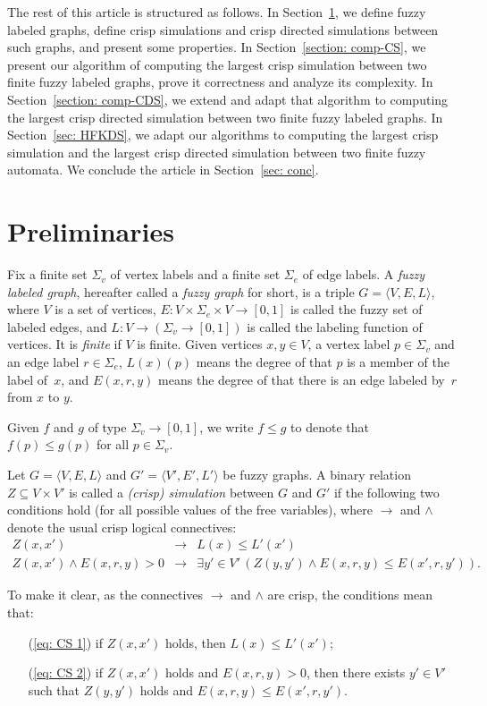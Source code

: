 \documentclass[11pt]{article}
\newcommand{\red}[1]{{#1}\xspace}
\newcommand{\markRed}{}
\def\tuple#1{\langle#1\rangle}
\def\eqref#1{(\ref{#1})}
\newcommand{\E}{\exists}
\newcommand{\SV}{\Sigma_v}
\newcommand{\SE}{\Sigma_e}
\begin{document}
The rest of this article is structured as follows. \red{In Section~\ref{section: prel}, we define fuzzy labeled graphs, define crisp simulations and crisp directed simulations between such graphs, and present some properties.} In Section~\ref{section: comp-CS}, we present our algorithm of computing the largest crisp simulation between two finite fuzzy labeled graphs, prove it correctness and analyze its complexity. In Section~\ref{section: comp-CDS}, we extend and adapt that algorithm to computing the largest crisp directed simulation between two finite fuzzy labeled graphs. \red{In Section~\ref{sec: HFKDS}, we adapt our algorithms to computing the largest crisp simulation and the largest crisp directed simulation between two finite fuzzy automata.} We conclude the article in Section~\ref{sec: conc}. 

\section{Preliminaries}
\label{section: prel}

Fix a finite set $\SV$ of vertex labels and a finite set $\SE$ of edge labels. 
%
A {\em fuzzy labeled graph}, hereafter called a {\em fuzzy graph} for short, is a triple $G = \tuple{V, E, L}$, where $V$ is a set of vertices, \mbox{$E: V \times \SE \times V \to [0,1]$} is called the fuzzy set of labeled edges, and $L: V \to (\SV \to [0,1])$ is called the labeling function of vertices. 
%
It is {\em finite} if $V$ is finite. 
%
Given vertices $x,y \in V$, a vertex label $p \in \SV$ and an edge label $r \in \SE$, $L(x)(p)$ means the degree of that $p$ is a member of the label of~$x$, and $E(x,r,y)$ means the degree of that there is an edge labeled by~$r$ from $x$ to $y$. 

Given $f$ and $g$ of type \mbox{$\SV \to [0,1]$}, we write $f \leq g$ to denote that $f(p) \leq g(p)$ for all $p \in \SV$. 

Let $G = \tuple{V, E, L}$ and $G' = \tuple{V', E', L'}$ be fuzzy graphs. 
%
A binary relation $Z \subseteq V \times V'$ is called a {\em (crisp) simulation} between $G$ and $G'$ if the following two conditions hold (for all possible values of the free variables), where $\to$ and $\land$ denote the usual crisp logical connectives: 
\begin{eqnarray}
Z(x,x') & \to & L(x) \leq L'(x') \label{eq: CS 1} \\[1ex]
Z(x,x') \land E(x,r,y) > 0 & \to & \E y' \in V'\,(Z(y,y') \land E(x,r,y) \leq E(x',r,y')). \label{eq: CS 2}
\end{eqnarray}
{\markRed
To make it clear, as the connectives $\to$ and $\land$ are crisp, the conditions mean that:
\begin{itemize}
\item[\eqref{eq: CS 1}] if $Z(x,x')$ holds, then $L(x) \leq L'(x')$;
\item[\eqref{eq: CS 2}] if $Z(x,x')$ holds and $E(x,r,y) > 0$, then there exists $y' \in V'$ such that $Z(y,y')$ holds and $E(x,r,y) \leq E(x',r,y')$.
\end{itemize}
}
\end{document}
